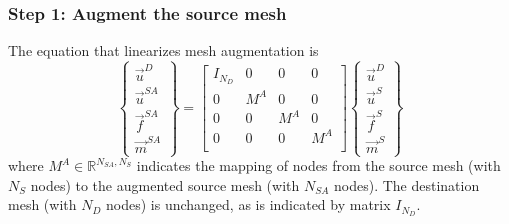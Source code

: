\documentclass[10pt,letterpaper,oneside,notitlepage]{article}
\begin{document}
\subsubsection{Step 1: Augment the source mesh}
The equation that linearizes mesh augmentation is
\begin{equation}
\label{Augment}
   \left\{   \begin{matrix} \vec{u}^D \\ \vec{u}^{SA} \\ \vec{f}^{SA} \\ \vec{m}^{SA} \end{matrix} \right\} 
=
   \begin{bmatrix}
   I_{\mathit{N_D}} & 0   & 0   & 0   \\
   0                      & M^A & 0   & 0   \\
   0                      & 0   & M^A & 0   \\
   0                      & 0   & 0   & M^A \\
   \end{bmatrix}
   \left\{   \begin{matrix} \vec{u}^D \\ \vec{u}^S \\ \vec{f}^S \\ \vec{m}^S \end{matrix} \right\} 
\end{equation}
where $M^A \in \mathbb{R}^{ \mathit{N_{SA}},\mathit{N_{S}}}$ indicates the mapping of nodes from the source mesh (with $N_S$ nodes) to the augmented source mesh
(with $N_{SA}$ nodes). The destination mesh (with $N_D$ nodes) is unchanged, as is indicated by matrix $I_{\mathit{N_D}}$.
\end{document}
